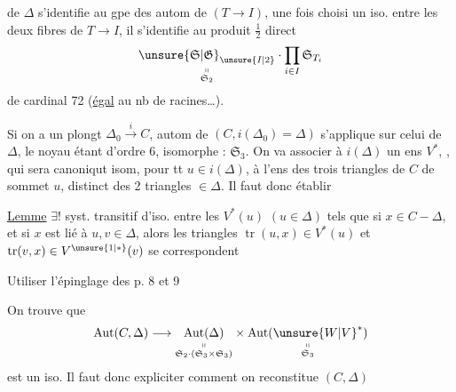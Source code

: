 de $\Delta$  s'identifie au gpe des autom de $(T\longrightarrow I)$, une fois choisi un iso. entre les deux fibres de $T\to I$, il s'identifie au produit $\tfrac12$ direct
\[
\underset{\substack{\shortparallel\\\mathfrak S_2}}{\unsure{\mathfrak S|\mathfrak G}_{\unsure{I|2}}}\cdot\prod_{i\in I}\mathfrak S_{T_i}
\]
de cardinal 72 (\uline{égal} au nb de racines\ldots).

Si on a un plongt $\Delta_0\xrightarrow{i} C$,   autom de $(C,i(\Delta_0)=\Delta)$ s'applique sur celui de $\Delta$, le noyau étant d'ordre 6, isomorphe : $\mathfrak S_3$. On va associer à $i(\Delta)$ un ens $V^*$, , qui sera canoniqut isom, pour tt $u\in i(\Delta)$, à  l'ens  des trois triangles de $C$ de sommet $u$, distinct des 2 triangles $\in\Delta$. Il faut donc établir

\uline{Lemme} \quad $\exists!$ syst. transitif d'iso. entre les $V^*(u)$ $(u\in\Delta)$ tels que si $x\in C-\Delta$, et si $x$ est lié à $u,v\in\Delta$, alors les triangles $\operatorname{tr}(u,x)\in V^*(u)$ et $\operatorname{tr}(v,x)\in V^{\unsure{1|*}}(v)$ se correspondent

Utiliser l'épinglage des p. 8 et 9

On trouve que
\[
\operatorname{Aut}(C,\Delta)\longrightarrow
\underset{\substack{\shortparallel\\\mathfrak S_2\cdot(\mathfrak S_3\times\mathfrak S_3)}}{\operatorname{Aut}(\Delta)}
\times\underset{\substack{\shortparallel\\\mathfrak S_3}}{\operatorname{Aut}(\unsure{W|V}^*)}
\]
est un iso. Il faut donc expliciter comment on reconstitue $(C,\Delta)$
